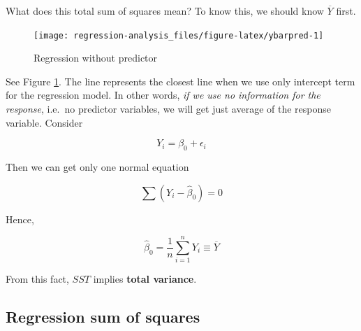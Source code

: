 \documentclass[]{book}
\newenvironment{Shaded}{\begin{snugshade}}{\end{snugshade}}
\newcommand{\DataTypeTok}[1]{\textcolor[rgb]{0.13,0.29,0.53}{#1}}
\newcommand{\DecValTok}[1]{\textcolor[rgb]{0.00,0.00,0.81}{#1}}
\newcommand{\KeywordTok}[1]{\textcolor[rgb]{0.13,0.29,0.53}{\textbf{#1}}}
\newcommand{\NormalTok}[1]{#1}
\newcommand{\OperatorTok}[1]{\textcolor[rgb]{0.81,0.36,0.00}{\textbf{#1}}}
\newcommand{\OtherTok}[1]{\textcolor[rgb]{0.56,0.35,0.01}{#1}}
\newcommand{\StringTok}[1]{\textcolor[rgb]{0.31,0.60,0.02}{#1}}
\theoremstyle{definition}
\theoremstyle{definition}
\theoremstyle{definition}
\theoremstyle{remark}
\begin{document}
What does this total sum of squares mean? To know this, we should know \(\overline{Y}\) first.

\begin{Shaded}
\end{Shaded}

\begin{figure}[H]

{\centering \texttt{[image: regression-analysis\_files/figure-latex/ybarpred-1]} 

}

\caption{Regression without predictor}\label{fig:ybarpred}
\end{figure}

See Figure \ref{fig:ybarpred}. The line represents the closest line when we use only intercept term for the regression model. In other words, \emph{if we use no information for the response}, i.e.~no predictor variables, we will get just average of the response variable. Consider

\[Y_i = \beta_0 + \epsilon_i\]

Then we can get only one normal equation

\[\sum (Y_i - \hat\beta_0) = 0\]

Hence,

\[\hat\beta_0 = \frac{1}{n} \sum_{i = 1}^n Y_i \equiv \overline{Y}\]

From this fact, \(SST\) implies \textbf{total variance}.

\hypertarget{regression-sum-of-squares}{%
\subsection{Regression sum of squares}\label{regression-sum-of-squares}}
\end{document}
